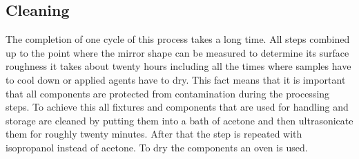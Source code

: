 \subsection{Cleaning}
The completion of one cycle of this process takes a long time. All steps combined up to the point where the mirror shape can be measured to determine its surface roughness it takes about twenty hours including all the times where samples have to cool down or applied agents have to dry. This fact means that it is important that all components are protected from contamination during the processing steps. To achieve this all fixtures and components that are used for handling and storage are cleaned by putting them into a bath of acetone and then ultrasonicate them for roughly twenty minutes. After that the step is repeated with isopropanol instead of acetone. To dry the components an oven is used.

